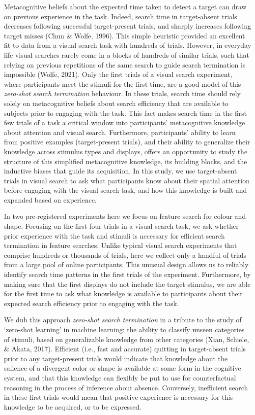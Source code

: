 \documentclass[12pt,twoside]{reedthesis}
\begin{document}
Metacognitive beliefs about the expected time taken to detect a target can draw on previous experience in the task. Indeed, search time in target-absent trials decreases following successful target-present trials, and sharply increases following target misses (Chun \& Wolfe, 1996). This simple heuristic provided an excellent fit to data from a visual search task with hundreds of trials. However, in everyday life visual searches rarely come in a blocks of hundreds of similar trials, such that relying on previous repetitions of the same search to guide search termination is impossible (Wolfe, 2021). Only the first trials of a visual search experiment, where participants meet the stimuli for the first time, are a good model of this \emph{zero-shot search termination} behaviour. In these trials, search time should rely solely on metacognitive beliefs about search efficiency that are available to subjects prior to engaging with the task. This fact makes search time in the first few trials of a task a critical window into participants' metacognitive knowledge about attention and visual search. Furthermore, participants' ability to learn from positive examples (target-present trials), and their ability to generalize their knowledge across stimulus types and displays, offers an opportunity to study the structure of this simplified metacognitive knowledge, its building blocks, and the inductive biases that guide its acquisition. In this study, we use target-absent trials in visual search to ask what participants know about their spatial attention before engaging with the visual search task, and how this knowledge is built and expanded based on experience.

In two pre-registered experiments here we focus on feature search for colour and shape. Focusing on the first four trials in a visual search task, we ask whether prior experience with the task and stimuli is necessary for efficient search termination in feature searches. Unlike typical visual search experiments that comprise hundreds or thousands of trials, here we collect only a handful of trials from a large pool of online participants. This unusual design allows us to reliably identify search time patterns in the first trials of the experiment. Furthermore, by making sure that the first displays do not include the target stimulus, we are able for the first time to ask what knowledge is available to participants about their expected search efficiency prior to engaging with the task.

We dub this approach \emph{zero-shot search termination} in a tribute to the study of `zero-shot learning' in machine learning: the ability to classify unseen categories of stimuli, based on generalizable knowledge from other categories (Xian, Schiele, \& Akata, 2017). Efficient (i.e., fast and accurate) quitting in target-absent trials prior to any target-present trials would indicate that knowledge about the salience of a divergent color or shape is available at some form in the cognitive system, and that this knowledge can flexibly be put to use for counterfactual reasoning in the process of inference about absence. Conversely, inefficient search in these first trials would mean that positive experience is necessary for this knowledge to be acquired, or to be expressed.
\end{document}
